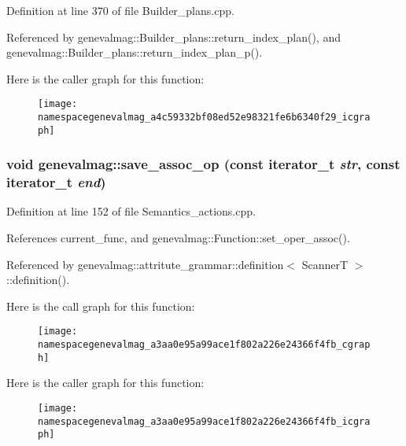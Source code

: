 Definition at line 370 of file Builder\_\-plans.cpp.



Referenced by genevalmag::Builder\_\-plans::return\_\-index\_\-plan(), and genevalmag::Builder\_\-plans::return\_\-index\_\-plan\_\-p().



Here is the caller graph for this function:\nopagebreak
\begin{figure}[H]
\begin{center}
\leavevmode
\texttt{[image: namespacegenevalmag\_a4c59332bf08ed52e98321fe6b6340f29\_icgraph]}
\end{center}
\end{figure}


\hypertarget{namespacegenevalmag_a3aa0e95a99ace1f802a226e24366f4fb}{
\subsubsection[{save\_\-assoc\_\-op}]{\setlength{\rightskip}{0pt plus 5cm}void genevalmag::save\_\-assoc\_\-op (const iterator\_\-t {\em str}, \/  const iterator\_\-t {\em end})}}
\label{namespacegenevalmag_a3aa0e95a99ace1f802a226e24366f4fb}


Definition at line 152 of file Semantics\_\-actions.cpp.



References current\_\-func, and genevalmag::Function::set\_\-oper\_\-assoc().



Referenced by genevalmag::attritute\_\-grammar::definition$<$ ScannerT $>$::definition().



Here is the call graph for this function:\nopagebreak
\begin{figure}[H]
\begin{center}
\leavevmode
\texttt{[image: namespacegenevalmag\_a3aa0e95a99ace1f802a226e24366f4fb\_cgraph]}
\end{center}
\end{figure}




Here is the caller graph for this function:\nopagebreak
\begin{figure}[H]
\begin{center}
\leavevmode
\texttt{[image: namespacegenevalmag\_a3aa0e95a99ace1f802a226e24366f4fb\_icgraph]}
\end{center}
\end{figure}


